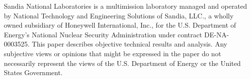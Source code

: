 
Sandia National Laboratories is a multimission laboratory managed
and operated by National Technology and Engineering Solutions of
Sandia, LLC., a wholly owned subsidiary of Honeywell International,
Inc., for the U.S. Department of Energy's National Nuclear Security
Administration under contract DE-NA-0003525.
This paper describes objective technical results and analysis. 
Any subjective views or opinions that might be expressed in the paper 
do not necessarily represent the views of the U.S. Department of 
Energy or the United States Government.

